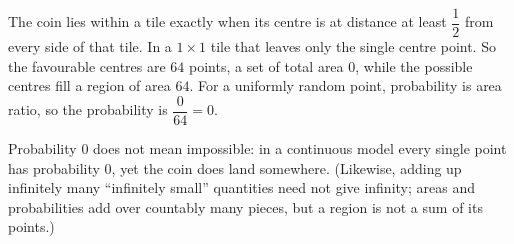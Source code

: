 The coin lies within a tile exactly when its centre is at distance at least $\dfrac{1}{2}$ from every side of that tile. In a $1\times1$ tile that leaves only the single centre point. So the favourable centres are $64$ points, a set of total area $0$, while the possible centres fill a region of area $64$. For a uniformly random point, probability is area ratio, so the probability is $\dfrac{0}{64}=\boxed{0}$.

Probability $0$ does not mean impossible: in a continuous model every single point has probability $0$, yet the coin does land somewhere. (Likewise, adding up infinitely many ``infinitely small'' quantities need not give infinity; areas and probabilities add over countably many pieces, but a region is not a sum of its points.)
